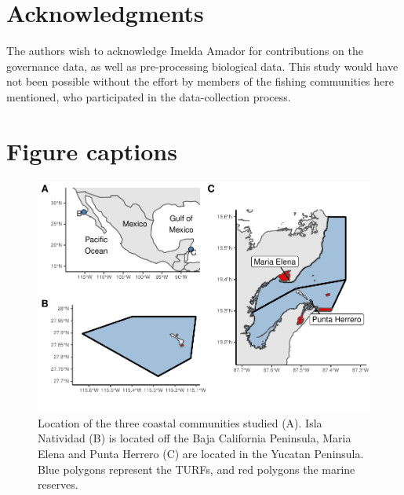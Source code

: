\documentclass{frontiersSCNS}
\begin{document}
\section*{Acknowledgments}

The authors wish to acknowledge Imelda Amador for contributions on the
governance data, as well as pre-processing biological data. This study
would have not been possible without the effort by members of the
fishing communities here mentioned, who participated in the
data-collection process.

\clearpage




\clearpage

\section*{Figure captions}

\begin{figure}
\centering
\includegraphics{manuscript_files/figure-latex/unnamed-chunk-7-1.pdf}
\caption{\label{fig:unnamed-chunk-7}\label{fig:map}Location of the three
coastal communities studied (A). Isla Natividad (B) is located off the
Baja California Peninsula, Maria Elena and Punta Herrero (C) are located
in the Yucatan Peninsula. Blue polygons represent the TURFs, and red
polygons the marine reserves.}
\end{figure}
\end{document}
